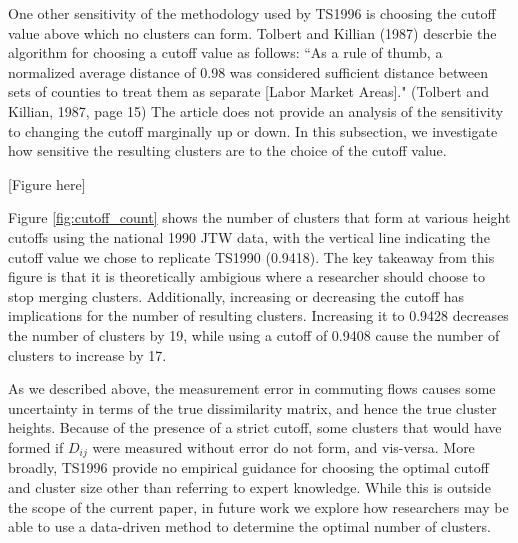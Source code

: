 One other sensitivity of the methodology used by TS1996 is choosing the cutoff value above which no clusters can form. Tolbert and Killian (1987) descrbie the algorithm for choosing a cutoff value as follows: ``As a rule of thumb, a normalized average distance of 0.98 was considered sufficient distance between sets of counties to treat them as separate [Labor Market Areas]." (Tolbert and Killian, 1987, page 15) The article does not provide an analysis of the sensitivity to changing the cutoff marginally up or down. In this subsection, we investigate how sensitive the resulting clusters are to the choice of the cutoff value.

[Figure here]

Figure \ref{fig:cutoff_count} shows the number of clusters that form at various height cutoffs using the national 1990 JTW data, with the vertical line indicating the cutoff value we chose to replicate TS1990 (0.9418). The key takeaway from this figure is that it is theoretically ambigious where a researcher should choose to stop merging clusters. Additionally, increasing or decreasing the cutoff has implications for the number of resulting clusters. Increasing it to 0.9428 decreases the number of clusters by 19, while using a cutoff of 0.9408 cause the number of clusters to increase by 17.

As we described above, the measurement error in commuting flows causes some uncertainty in terms of the true dissimilarity matrix, and hence the true cluster heights. Because of the presence of a strict cutoff, some clusters that would have formed if $D_{ij}$ were measured without error do not form, and vis-versa. More broadly, TS1996 provide no empirical guidance for choosing the optimal cutoff and cluster size other than referring to expert knowledge. While this is outside the scope of the current paper, in future work we explore how researchers may be able to use a data-driven method to determine the optimal number of clusters.

